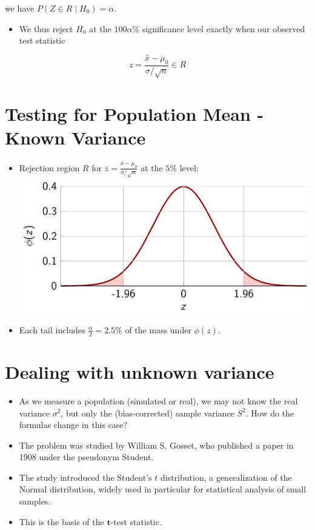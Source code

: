 \documentclass[10pt]{article}
\begin{document}
we have $P\left(Z \in R \mid H_{0}\right)=\alpha$.

\begin{itemize}
  \item We thus reject $H_{0}$ at the $100 \alpha \%$ significance level exactly when our observed test statistic
\end{itemize}

$$
z=\frac{\bar{x}-\mu_{0}}{\sigma / \sqrt{n}} \in R
$$

\section*{Testing for Population Mean - Known Variance}
\begin{itemize}
  \item Rejection region $R$ for $z=\frac{\bar{x}-\mu_{0}}{\sigma / \sqrt{n}}$ at the $5 \%$ level:\\
\includegraphics[max width=\textwidth, center]{2025_05_12_2c033a5f0417cd8b136fg-43}
  \item Each tail includes $\frac{\alpha}{2}=2.5 \%$ of the mass under $\phi(z)$.
\end{itemize}

\section*{Dealing with unknown variance}
\begin{itemize}
  \item As we measure a population (simulated or real), we may not know the real variance $\sigma^{2}$, but only the (bias-corrected) sample variance $S^{2}$. How do the formulas change in this case?
  \item The problem was studied by William S. Gosset, who published a paper in 1908 under the pseudonym Student.
  \item The study introduced the Student's $t$ distribution, a generalization of the Normal distribution, widely used in particular for statistical analysis of small samples.
  \item This is the basis of the $\mathbf{t}$-test statistic.
\end{itemize}
\end{document}
